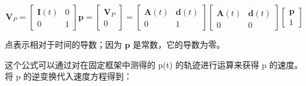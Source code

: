 \begin{equation}
\mathbf{V}_P = 
\begin{bmatrix}
\mathbf{I}(t) & 0 \\
0 & 1 
\end{bmatrix}
\mathbf{p} = 
\begin{bmatrix}
\mathbf{V}_P \\
0
\end{bmatrix} = 
\begin{bmatrix}
\mathbf{A}(t) & \mathbf{d}(t) \\
0 & 1 
\end{bmatrix}
\begin{bmatrix}
\dot{\mathbf{A}}(t) & \dot{\mathbf{d}}(t) \\
0 & 0
\end{bmatrix}
\begin{bmatrix}
\mathbf{p} \\
1
\end{bmatrix}~
\end{equation}

点表示相对于时间的导数；因为 $\mathbf{p}$ 是常数，它的导数为零。

这个公式可以通过对在固定框架中测得的 p(t) 的轨迹进行运算来获得 p 的速度。将 p 的逆变换代入速度方程得到：

